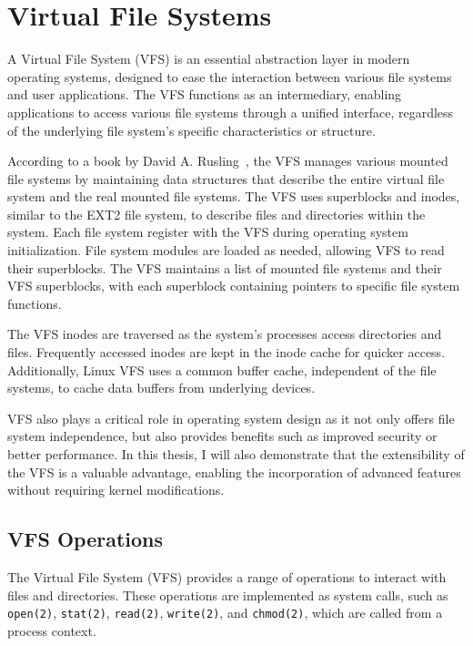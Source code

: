 \section{Virtual File Systems}\label{sec:virtual-file-systems}

A Virtual File System (VFS) is an essential abstraction layer in modern operating systems, designed to ease the interaction between various file systems and user applications.
The VFS functions as an intermediary, enabling applications to access various file systems through a unified interface, regardless of the underlying file system's specific characteristics or structure.

According to a book by David A. Rusling~\cite{rusling-linux}, the VFS manages various mounted file systems by maintaining data structures that describe the entire virtual file system and the real mounted file systems.
The VFS uses superblocks and inodes, similar to the EXT2 file system, to describe files and directories within the system.
Each file system register with the VFS during operating system initialization.
File system modules are loaded as needed, allowing VFS to read their superblocks.
The VFS maintains a list of mounted file systems and their VFS superblocks, with each superblock containing pointers to specific file system functions.

The VFS inodes are traversed as the system's processes access directories and files.
Frequently accessed inodes are kept in the inode cache for quicker access.
Additionally, Linux VFS uses a common buffer cache, independent of the file systems, to cache data buffers from underlying devices.

VFS also plays a critical role in operating system design as it not only offers file system independence, but also provides benefits such as improved security or better performance.
In this thesis, I will also demonstrate that the extensibility of the VFS is a valuable advantage, enabling the incorporation of advanced features without requiring kernel modifications.

\subsection{VFS Operations}\label{subsec:vfs-operations}

The Virtual File System (VFS) provides a range of operations to interact with files and directories.
These operations are implemented as system calls, such as \texttt{open(2)}, \texttt{stat(2)}, \texttt{read(2)}, \texttt{write(2)}, and \texttt{chmod(2)}, which are called from a process context.

